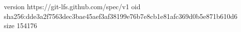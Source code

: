 version https://git-lfs.github.com/spec/v1
oid sha256:dde3a2f7563dec3bae45aef3af38199e76b7e8cb1e81afc369d0b5e871b610d6
size 154176
